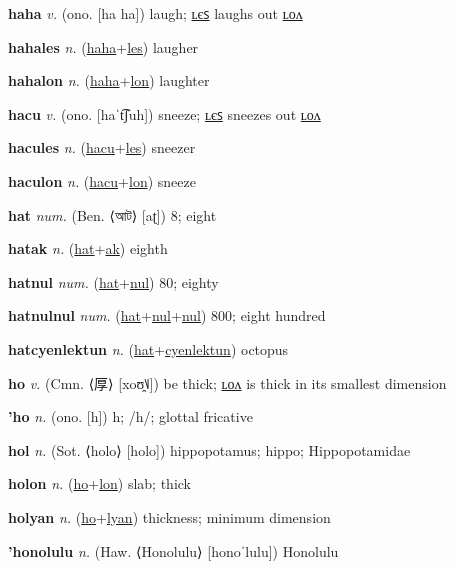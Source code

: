 \textbf{\hypertarget{haha}{haha}} \textit{v.} (ono. [ha ha])
laugh; \hyperlink{hahales}{ʟєꜱ} laughs out \hyperlink{hahalon}{ʟᴏᴧ}

\textbf{\hypertarget{hahales}{hahales}} \textit{n.} (\hyperlink{haha}{haha}+\allowbreak \hyperlink{les}{les})
laugher

\textbf{\hypertarget{hahalon}{hahalon}} \textit{n.} (\hyperlink{haha}{haha}+\allowbreak \hyperlink{lon}{lon})
laughter

\textbf{\hypertarget{hacu}{hacu}} \textit{v.} (ono. [haˈt͡ʃuh])
sneeze; \hyperlink{hacules}{ʟєꜱ} sneezes out \hyperlink{haculon}{ʟᴏᴧ}

\textbf{\hypertarget{hacules}{hacules}} \textit{n.} (\hyperlink{hacu}{hacu}+\allowbreak \hyperlink{les}{les})
sneezer

\textbf{\hypertarget{haculon}{haculon}} \textit{n.} (\hyperlink{hacu}{hacu}+\allowbreak \hyperlink{lon}{lon})
sneeze

\textbf{\hypertarget{hat}{hat}} \textit{num.} (Ben. ⟨{\bengali{}আট}⟩ [aʈ])
8; eight

\textbf{\hypertarget{hatak}{hatak}} \textit{n.} (\hyperlink{hat}{hat}+\allowbreak \hyperlink{ak}{ak})
eighth

\textbf{\hypertarget{hatnul}{hatnul}} \textit{num.} (\hyperlink{hat}{hat}+\allowbreak \hyperlink{nul}{nul})
80; eighty

\textbf{\hypertarget{hatnulnul}{hatnulnul}} \textit{num.} (\hyperlink{hat}{hat}+\allowbreak \hyperlink{nul}{nul}+\allowbreak \hyperlink{nul}{nul})
800; eight hundred

\textbf{\hypertarget{hatcyenlektun}{hatcyenlektun}} \textit{n.} (\hyperlink{hat}{hat}+\allowbreak \hyperlink{cyenlektun}{cyenlektun})
octopus

\textbf{\hypertarget{ho}{ho}} \textit{v.} (Cmn. ⟨{\chinese{}厚}⟩ [xoʊ̯˥˩])
be thick; \hyperlink{holon}{ʟᴏᴧ} is thick in its smallest dimension

\textbf{\hypertarget{'ho}{'ho}} \textit{n.} (ono. [h])
h; /h/; glottal fricative

\textbf{\hypertarget{hol}{hol}} \textit{n.} (Sot. ⟨holo⟩ [holo])
hippopotamus; hippo; Hippopotamidae

\textbf{\hypertarget{holon}{holon}} \textit{n.} (\hyperlink{ho}{ho}+\allowbreak \hyperlink{lon}{lon})
slab; thick

\textbf{\hypertarget{holyan}{holyan}} \textit{n.} (\hyperlink{ho}{ho}+\allowbreak \hyperlink{lyan}{lyan})
thickness; minimum dimension

\textbf{\hypertarget{'honolulu}{'honolulu}} \textit{n.} (Haw. ⟨Honolulu⟩ [honoˈlulu])
Honolulu

